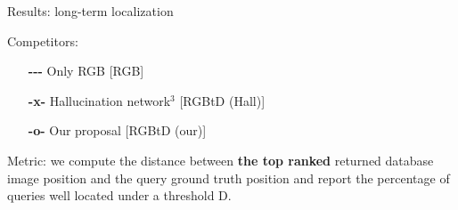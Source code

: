 \begin{frame}{Results: long-term localization}
\begin{minipage}{0.49\linewidth}
\begin{minipage}{0.49\linewidth}
		\end{minipage}
		\begin{minipage}{0.49\linewidth}
		   \scriptsize
			Competitors:
			\begin{itemize}
				\item[\textbf{-{}-{}-}] Only RGB [RGB]
				\item[\textbf{-x-}] Hallucination network$^3$ [RGBtD (Hall)]
				\item[\textbf{-o-}] Our proposal [RGBtD (our)]
			\end{itemize}
		\end{minipage}
		\vspace{0.5cm}		
		
		Metric: we compute the distance between \textbf{the top ranked} returned database image position and the query ground truth position and report the percentage of queries well located under a threshold D.
	\end{minipage}
	\textcolor{white}{}
\end{frame}

